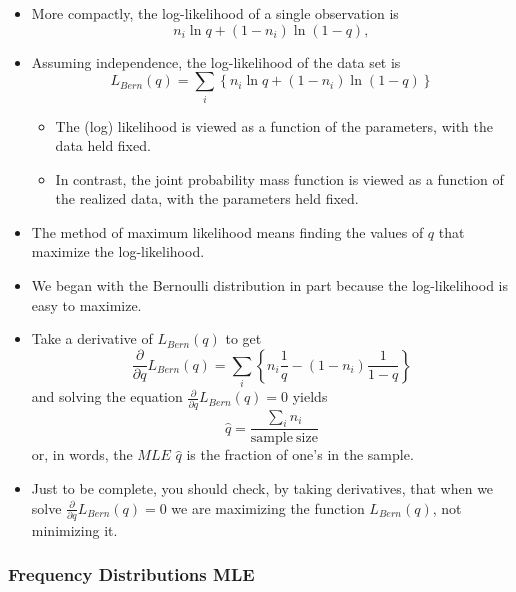 \documentclass[]{book}
\theoremstyle{definition}
\theoremstyle{definition}
\theoremstyle{definition}
\theoremstyle{remark}
\begin{document}
\begin{itemize}
\item
  More compactly, the log-likelihood of a single observation is
  \[n_i \ln q + (1-n_i)\ln ( 1-q ) ,\]
\item
  Assuming independence, the log-likelihood of the data set is
  \[L_{Bern}(q)=\sum_i \left\{ n_i \ln q + (1-n_i)\ln ( 1-q ) \right\}\]

  \begin{itemize}
  \item
    The (log) likelihood is viewed as a function of the parameters, with
    the data held fixed.
  \item
    In contrast, the joint probability mass function is viewed as a
    function of the realized data, with the parameters held fixed.
  \end{itemize}
\item
  The method of maximum likelihood means finding the values of \(q\)
  that maximize the log-likelihood.
\item
  We began with the Bernoulli distribution in part because the
  log-likelihood is easy to maximize.
\item
  Take a derivative of \(L_{Bern}(q)\) to get
  \[\frac{\partial}{\partial q} L_{Bern}(q)=\sum_i \left\{ n_i \frac{1}{q} - (1-n_i)\frac{1}{1-q} \right\}\]
  and solving the equation
  \(\frac{\partial}{\partial q} L_{Bern}(q) =0\) yields
  \[\hat{q} = \frac{\sum_i n_i}{\mathrm{sample ~size}}\] or, in words,
  the \(MLE\) \(\hat{q}\) is the fraction of one's in the sample.
\item
  Just to be complete, you should check, by taking derivatives, that
  when we solve \(\frac{\partial}{\partial q} L_{Bern}(q) =0\) we are
  maximizing the function \(L_{Bern}(q)\), not minimizing it.
\end{itemize}

\subsubsection{Frequency Distributions
MLE}\label{frequency-distributions-mle}
\end{document}
